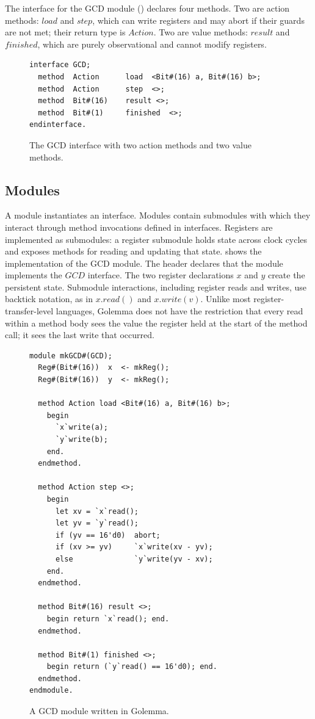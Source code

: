 \documentclass[fontset=fira-newtxsf]{mitthesis}
\theoremstyle{definition}
\theoremstyle{plain}
\begin{document}
The interface for the GCD module () declares four methods.
Two are action methods: $\mathit{load}$ and $\mathit{step}$, which can write registers and may abort if their guards are not met; their return type is $\mathit{Action}$.
Two are value methods: $\mathit{result}$ and $\mathit{finished}$, which are purely observational  and cannot modify registers.

\begin{figure}[H]
\begin{verbatim}
interface GCD;
  method  Action      load  <Bit#(16) a, Bit#(16) b>;
  method  Action      step  <>;
  method  Bit#(16)    result <>;
  method  Bit#(1)     finished  <>;
endinterface.
\end{verbatim}
\caption[GCD interface]{The GCD interface with two action methods and two value methods.}
\label{fig:Golemma-gcd-intf}
\end{figure}

\subsection{Modules}
A module instantiates an interface.
Modules contain submodules with which they interact through method invocations defined in interfaces.
Registers are implemented as submodules: a register submodule holds state across clock cycles and exposes methods for reading and updating that state.
 shows the implementation of the GCD module.
The header declares that the module implements the $\mathit{GCD}$ interface.
The two register declarations $\mathit{x}$ and $\mathit{y}$ create the persistent state.
Submodule interactions, including register reads and writes, use backtick notation, as in $\mathit{x}.\mathit{read}()$ and $\mathit{x}.\mathit{write}(v)$.
Unlike most register-transfer-level languages, Golemma does not have the restriction that every read within a method body sees the value the register held at the start of the method call; it sees the last write that occurred.

\begin{figure}[t]
\begin{verbatim}
module mkGCD#(GCD);
  Reg#(Bit#(16))  x  <- mkReg();
  Reg#(Bit#(16))  y  <- mkReg();

  method Action load <Bit#(16) a, Bit#(16) b>;
    begin
      `x`write(a);
      `y`write(b);
    end.
  endmethod.

  method Action step <>;
    begin
      let xv = `x`read();
      let yv = `y`read();
      if (yv == 16'd0)  abort;
      if (xv >= yv)     `x`write(xv - yv);
      else              `y`write(yv - xv);
    end.
  endmethod.

  method Bit#(16) result <>;
    begin return `x`read(); end.
  endmethod.

  method Bit#(1) finished <>;
    begin return (`y`read() == 16'd0); end.
  endmethod.
endmodule.
\end{verbatim}
\caption[GCD module]{A GCD module written in Golemma.}
\label{fig:Golemma-gcd}
\end{figure}
\end{document}

